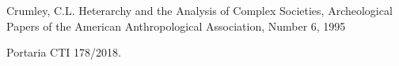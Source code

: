\documentclass[
12pt,		%
openright,	%
twoside,  %
a4paper,			%
chapter=TITLE,		%
english,			%
french,				%
spanish,			%
brazil				%
]{USPSC-classe/USPSC}
\begin{document}
\begin{flushleft}
\begin{flushleft}
\begin{flushleft}
\begin{flushleft}
\begin{flushleft}
\begin{flushleft}
\begin{flushleft}
\begin{flushleft}
\begin{flushleft}
[CRUMLEY, 1995] Crumley, C.L. Heterarchy and the Analysis of Complex Societies, Archeological Papers of the American Anthropological Association, Number 6, 1995
\end{flushleft}


\end{flushleft}


\end{flushleft}


\end{flushleft}


\end{flushleft}


\end{flushleft}


\end{flushleft}


\end{flushleft}


\end{flushleft}


\begin{flushleft}
\begin{flushleft}
\begin{flushleft}
\begin{flushleft}
\begin{flushleft}
\begin{flushleft}
\begin{flushleft}
\begin{flushleft}
\begin{flushleft}
[CTI, 2018] Portaria CTI 178/2018.
\end{flushleft}


\end{flushleft}


\end{flushleft}


\end{flushleft}


\end{flushleft}


\end{flushleft}


\end{flushleft}


\end{flushleft}


\end{flushleft}
\end{document}
